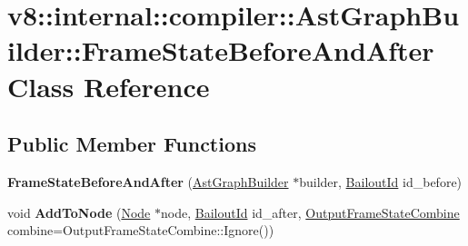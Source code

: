 \hypertarget{classv8_1_1internal_1_1compiler_1_1_ast_graph_builder_1_1_frame_state_before_and_after}{}\section{v8\+:\+:internal\+:\+:compiler\+:\+:Ast\+Graph\+Builder\+:\+:Frame\+State\+Before\+And\+After Class Reference}
\label{classv8_1_1internal_1_1compiler_1_1_ast_graph_builder_1_1_frame_state_before_and_after}
\subsection*{Public Member Functions}
\begin{DoxyCompactItemize}
\item 
{\bfseries Frame\+State\+Before\+And\+After} (\hyperlink{classv8_1_1internal_1_1compiler_1_1_ast_graph_builder}{Ast\+Graph\+Builder} $\ast$builder, \hyperlink{classv8_1_1internal_1_1_bailout_id}{Bailout\+Id} id\+\_\+before)\hypertarget{classv8_1_1internal_1_1compiler_1_1_ast_graph_builder_1_1_frame_state_before_and_after_a3955a5dab54e6d14dac883d86094e0e4}{}\label{classv8_1_1internal_1_1compiler_1_1_ast_graph_builder_1_1_frame_state_before_and_after_a3955a5dab54e6d14dac883d86094e0e4}

\item 
void {\bfseries Add\+To\+Node} (\hyperlink{classv8_1_1internal_1_1compiler_1_1_node}{Node} $\ast$node, \hyperlink{classv8_1_1internal_1_1_bailout_id}{Bailout\+Id} id\+\_\+after, \hyperlink{classv8_1_1internal_1_1compiler_1_1_output_frame_state_combine}{Output\+Frame\+State\+Combine} combine=Output\+Frame\+State\+Combine\+::\+Ignore())\hypertarget{classv8_1_1internal_1_1compiler_1_1_ast_graph_builder_1_1_frame_state_before_and_after_a5466eefce64de38e387a0b2127a5e48f}{}\label{classv8_1_1internal_1_1compiler_1_1_ast_graph_builder_1_1_frame_state_before_and_after_a5466eefce64de38e387a0b2127a5e48f}

\end{DoxyCompactItemize}
